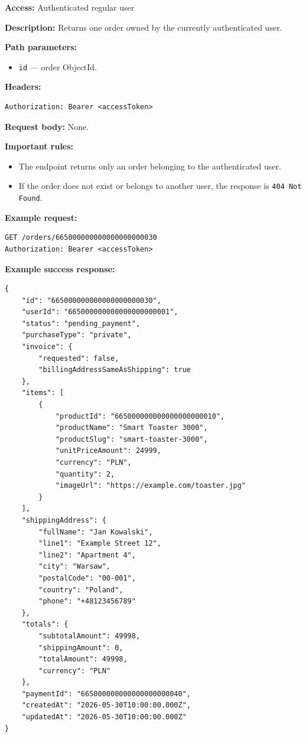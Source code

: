 \textbf{Access:} Authenticated regular user

\textbf{Description:} Returns one order owned by the currently authenticated user.

\textbf{Path parameters:}

\begin{itemize}
    \item \texttt{id} --- order ObjectId.
\end{itemize}

\textbf{Headers:}

\begin{verbatim}
Authorization: Bearer <accessToken>
\end{verbatim}

\textbf{Request body:} None.

\textbf{Important rules:}

\begin{itemize}
    \item The endpoint returns only an order belonging to the authenticated user.
    \item If the order does not exist or belongs to another user, the response is \texttt{404 Not Found}.
\end{itemize}

\textbf{Example request:}

\begin{verbatim}
GET /orders/665000000000000000000030
Authorization: Bearer <accessToken>
\end{verbatim}

\pagebreak
\textbf{Example success response:}

\begin{verbatim}
{
    "id": "665000000000000000000030",
    "userId": "665000000000000000000001",
    "status": "pending_payment",
    "purchaseType": "private",
    "invoice": {
        "requested": false,
        "billingAddressSameAsShipping": true
    },
    "items": [
        {
            "productId": "665000000000000000000010",
            "productName": "Smart Toaster 3000",
            "productSlug": "smart-toaster-3000",
            "unitPriceAmount": 24999,
            "currency": "PLN",
            "quantity": 2,
            "imageUrl": "https://example.com/toaster.jpg"
        }
    ],
    "shippingAddress": {
        "fullName": "Jan Kowalski",
        "line1": "Example Street 12",
        "line2": "Apartment 4",
        "city": "Warsaw",
        "postalCode": "00-001",
        "country": "Poland",
        "phone": "+48123456789"
    },
    "totals": {
        "subtotalAmount": 49998,
        "shippingAmount": 0,
        "totalAmount": 49998,
        "currency": "PLN"
    },
    "paymentId": "665000000000000000000040",
    "createdAt": "2026-05-30T10:00:00.000Z",
    "updatedAt": "2026-05-30T10:00:00.000Z"
}
\end{verbatim}